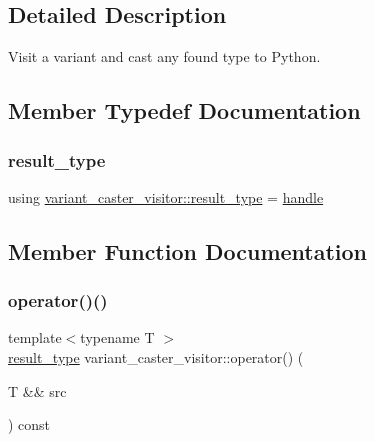 \subsection{Detailed Description}
Visit a variant and cast any found type to Python. 

\subsection{Member Typedef Documentation}
\mbox{\label{structvariant__caster__visitor_ab4ed60d65fd74fe08b5fc6ac714ca9b6}} 
\subsubsection{\texorpdfstring{result\_type}{result\_type}}
{\footnotesize\ttfamily using \mbox{\hyperlink{structvariant__caster__visitor_ab4ed60d65fd74fe08b5fc6ac714ca9b6}{variant\+\_\+caster\+\_\+visitor\+::result\+\_\+type}} =  \mbox{\hyperlink{classhandle}{handle}}}



\subsection{Member Function Documentation}
\mbox{\label{structvariant__caster__visitor_ab78e15bb76beb4aeb215cefea855f6d0}} 
\subsubsection{\texorpdfstring{operator()()}{operator()()}}
{\footnotesize\ttfamily template$<$typename T $>$ \\
\mbox{\hyperlink{structvariant__caster__visitor_ab4ed60d65fd74fe08b5fc6ac714ca9b6}{result\+\_\+type}} variant\+\_\+caster\+\_\+visitor\+::operator() (\begin{DoxyParamCaption}\item[{T \&\&}]{src }\end{DoxyParamCaption}) const\hspace{0.3cm}{\ttfamily [inline]}}



